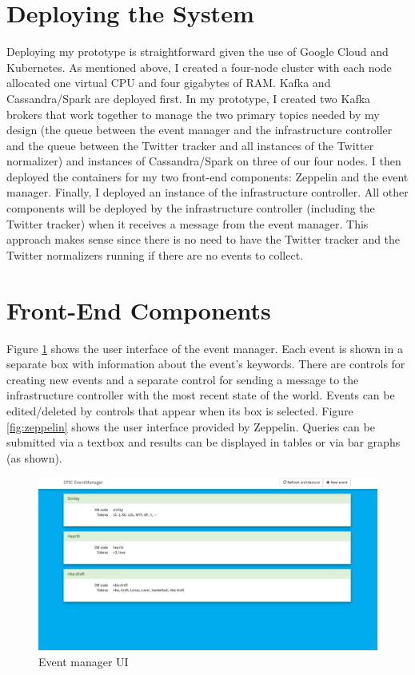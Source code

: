\section{Deploying the System}

Deploying my prototype is straightforward given the use of Google Cloud and Kubernetes. As mentioned above, I created a four-node cluster with each node allocated one virtual CPU and four gigabytes of RAM. Kafka and Cassandra/Spark are deployed first. In my prototype, I created two Kafka brokers that work together to manage the two primary topics needed by my design (the queue between the event manager and the infrastructure controller and the queue between the Twitter tracker and all instances of the Twitter normalizer) and instances of Cassandra/Spark on three of our four nodes. I then deployed the containers for my two front-end components: Zeppelin and the event manager. Finally, I deployed an instance of the infrastructure controller. All other components will be deployed by the infrastructure controller (including the Twitter tracker) when it receives a message from the event manager. This approach makes sense since there is no need to have the Twitter tracker and the Twitter normalizers running if there are no events to collect.


\section{Front-End Components}

Figure \ref{fig:eventmanager} shows the user interface of the event manager. Each event is shown in a separate box with information about the event’s keywords. There are controls for creating new events and a separate control for sending a message to the infrastructure controller with the most recent state of the world. Events can be edited/deleted by controls that appear when its box is selected. Figure \ref{fig:zeppelin} shows the user interface provided by Zeppelin. Queries can be submitted via a textbox and results can be displayed in tables or via bar graphs (as shown).

\begin{figure}
\centering
\includegraphics[width=\textwidth]{Figures/eventmanager}
\decoRule
\caption[Event Manager UI]{Event manager UI}
\label{fig:eventmanager}
\end{figure}

